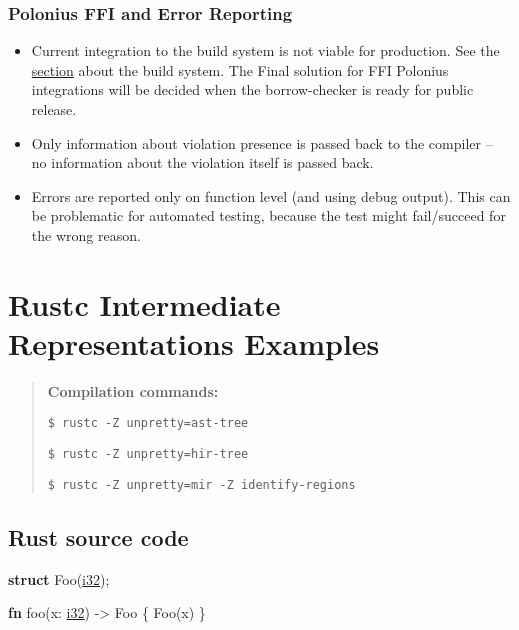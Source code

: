 \documentclass[
  11pt,
  twoside,symmetric]{report}
\newenvironment{Shaded}{}{}
\newcommand{\DataTypeTok}[1]{\underline{#1}}
\newcommand{\KeywordTok}[1]{\textbf{#1}}
\newcommand{\NormalTok}[1]{#1}
\newcommand{\OperatorTok}[1]{#1}
\providecommand{\tightlist}{%
  \setlength{\itemsep}{0pt}\setlength{\parskip}{0pt}}
\begin{document}
\hypertarget{polonius-ffi-and-error-reporting}{%
\subsection{Polonius FFI and Error
Reporting}\label{polonius-ffi-and-error-reporting}}

\begin{itemize}
\tightlist
\item
  Current integration to the build system is not viable for production.
  See the \protect\hyperlink{implementation}{section} about the build
  system. The Final solution for FFI Polonius integrations will be
  decided when the borrow-checker is ready for public release.
\item
  Only information about violation presence is passed back to the
  compiler -- no information about the violation itself is passed back.
\item
  Errors are reported only on function level (and using debug output).
  This can be problematic for automated testing, because the test might
  fail/succeed for the wrong reason.
\end{itemize}

\appendix

\hypertarget{rustc-intermediate-representations-examples}{%
\chapter{Rustc Intermediate Representations
Examples}\label{rustc-intermediate-representations-examples}}

\begin{quote}
\textbf{Compilation commands:}

\texttt{\$\ rustc\ -Z\ unpretty=ast-tree}

\texttt{\$\ rustc\ -Z\ unpretty=hir-tree}

\texttt{\$\ rustc\ -Z\ unpretty=mir\ -Z\ identify-regions}
\end{quote}

\hypertarget{rust-source-code}{%
\section{Rust source code}\label{rust-source-code}}

\begin{Shaded}
\begin{Highlighting}[]
    \KeywordTok{struct}\NormalTok{ Foo(}\DataTypeTok{i32}\NormalTok{)}\OperatorTok{;}

    \KeywordTok{fn}\NormalTok{ foo(x}\OperatorTok{:} \DataTypeTok{i32}\NormalTok{) }\OperatorTok{{-}\textgreater{}}\NormalTok{ Foo }\OperatorTok{\{}
\NormalTok{        Foo(x)}
    \OperatorTok{\}}
\end{Highlighting}
\end{Shaded}
\end{document}
